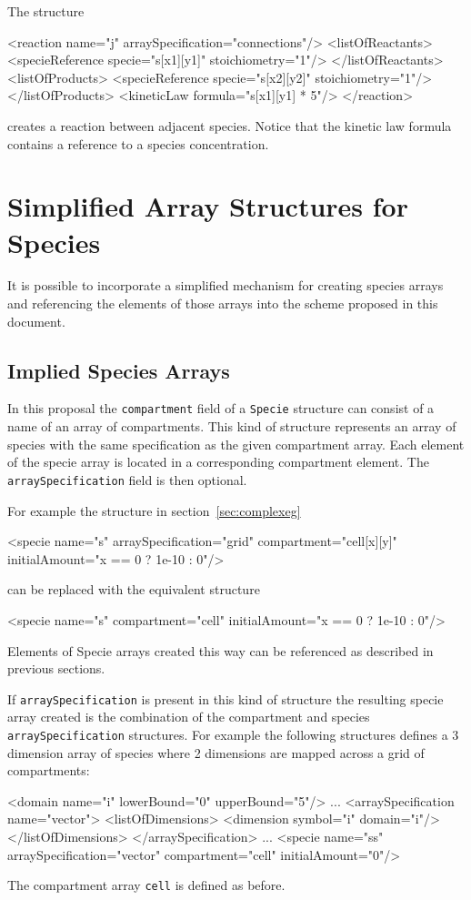 \documentclass{cekarticle}
\begin{document}
The structure
\begin{example}
<reaction name="j" arraySpecification="connections"/>
    <listOfReactants>
        <specieReference specie="s[x1][y1]" stoichiometry="1"/>
    </listOfReactants>
    <listOfProducts>
        <specieReference specie="s[x2][y2]" stoichiometry="1"/>
    </listOfProducts>
    <kineticLaw formula="s[x1][y1] * 5"/>
</reaction>
\end{example}
creates a reaction between adjacent species.  Notice that the
kinetic law formula contains a reference to a species
concentration.

\section{Simplified Array Structures for Species}

It is possible to incorporate a simplified mechanism for creating
species arrays and referencing the elements of those arrays into
the scheme proposed in this document.

\subsection{Implied Species Arrays}
\label{sec:impliedarrays}

In this proposal the \texttt{compartment} field of a
\texttt{Specie} structure can consist of a name of an array of
compartments. This kind of structure represents an array of
species with the same specification as the given compartment
array.  Each element of the specie array is located in a
corresponding compartment element.  The
\texttt{arraySpecification} field is then optional.

For example the structure in section~\ref{sec:complexeg}
\begin{example}
<specie name="s" arraySpecification="grid"
    compartment="cell[x][y]" initialAmount="x == 0 ? 1e-10 : 0"/>
\end{example}
can be replaced with the equivalent structure
\begin{example}
<specie name="s" compartment="cell" initialAmount="x == 0 ? 1e-10 : 0"/>
\end{example}

Elements of Specie arrays created this way can be referenced as
described in previous sections.

If \texttt{arraySpecification} is present in this kind of
structure the resulting specie array created is the combination
of the compartment and species \texttt{arraySpecification}
structures.  For example the following structures defines a 3
dimension array of species where 2 dimensions are mapped across a
grid of compartments:
\begin{example}
<domain name="i" lowerBound="0" upperBound="5"/>
...
<arraySpecification name="vector">
    <listOfDimensions>
        <dimension symbol="i" domain="i"/>
    </listOfDimensions>
</arraySpecification>
...
<specie name="ss" arraySpecification="vector"
    compartment="cell" initialAmount="0"/>
\end{example}
The compartment array \texttt{cell} is defined as before.
\end{document}
